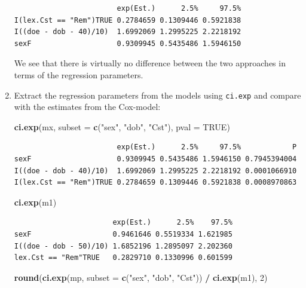 \documentclass[
]{book}
\newenvironment{Shaded}{\begin{snugshade}}{\end{snugshade}}
\newcommand{\AttributeTok}[1]{\textcolor[rgb]{0.13,0.29,0.53}{#1}}
\newcommand{\ConstantTok}[1]{\textcolor[rgb]{0.56,0.35,0.01}{#1}}
\newcommand{\DecValTok}[1]{\textcolor[rgb]{0.00,0.00,0.81}{#1}}
\newcommand{\FunctionTok}[1]{\textcolor[rgb]{0.13,0.29,0.53}{\textbf{#1}}}
\newcommand{\NormalTok}[1]{#1}
\newcommand{\SpecialCharTok}[1]{\textcolor[rgb]{0.81,0.36,0.00}{\textbf{#1}}}
\newcommand{\StringTok}[1]{\textcolor[rgb]{0.31,0.60,0.02}{#1}}
\begin{document}
\begin{enumerate}
\begin{verbatim}
                        exp(Est.)      2.5%     97.5%
I(lex.Cst == "Rem")TRUE 0.2784659 0.1309446 0.5921838
I((doe - dob - 40)/10)  1.6992069 1.2995225 2.2218192
sexF                    0.9309945 0.5435486 1.5946150
\end{verbatim}

  We see that there is virtually no difference between the two
  approaches in terms of the regression parameters.
\item
  Extract the regression parameters from the models using
  \texttt{ci.exp} and compare with the estimates from the Cox-model:

\begin{Shaded}
\begin{Highlighting}[]
\FunctionTok{ci.exp}\NormalTok{(mx, }\AttributeTok{subset =} \FunctionTok{c}\NormalTok{(}\StringTok{"sex"}\NormalTok{, }\StringTok{"dob"}\NormalTok{, }\StringTok{"Cst"}\NormalTok{), }\AttributeTok{pval =} \ConstantTok{TRUE}\NormalTok{)}
\end{Highlighting}
\end{Shaded}

\begin{verbatim}
                        exp(Est.)      2.5%     97.5%            P
sexF                    0.9309945 0.5435486 1.5946150 0.7945394004
I((doe - dob - 40)/10)  1.6992069 1.2995225 2.2218192 0.0001066910
I(lex.Cst == "Rem")TRUE 0.2784659 0.1309446 0.5921838 0.0008970863
\end{verbatim}

\begin{Shaded}
\begin{Highlighting}[]
\FunctionTok{ci.exp}\NormalTok{(m1)}
\end{Highlighting}
\end{Shaded}

\begin{verbatim}
                       exp(Est.)      2.5%    97.5%
sexF                   0.9461646 0.5519334 1.621985
I((doe - dob - 50)/10) 1.6852196 1.2895097 2.202360
lex.Cst == "Rem"TRUE   0.2829710 0.1330996 0.601599
\end{verbatim}

\begin{Shaded}
\begin{Highlighting}[]
\FunctionTok{round}\NormalTok{(}\FunctionTok{ci.exp}\NormalTok{(mp, }\AttributeTok{subset =} \FunctionTok{c}\NormalTok{(}\StringTok{"sex"}\NormalTok{, }\StringTok{"dob"}\NormalTok{, }\StringTok{"Cst"}\NormalTok{)) }\SpecialCharTok{/} \FunctionTok{ci.exp}\NormalTok{(m1), }\DecValTok{2}\NormalTok{)}
\end{Highlighting}
\end{Shaded}


\end{enumerate}
\end{document}
